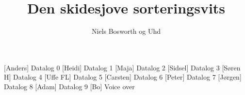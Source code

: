 \documentclass[a4paper,11pt]{article}
\title{Den skidesjove sorteringsvits}
\author{Niels Bosworth og Uhd}
\begin{document}
\maketitle

\begin{roles}
  [Anders] Datalog 0
  [Heidi] Datalog 1
  [Maja] Datalog 2
  [Sidsel] Datalog 3
  [Søren H] Datalog 4
  [Uffe FL] Datalog 5
  [Carsten] Datalog 6
  [Peter] Datalog 7
  [Jørgen] Datalog 8
  [Adam] Datalog 9
  [Bo] Voice over
\end{roles}

\begin{props}
\end{props}
\end{document}
